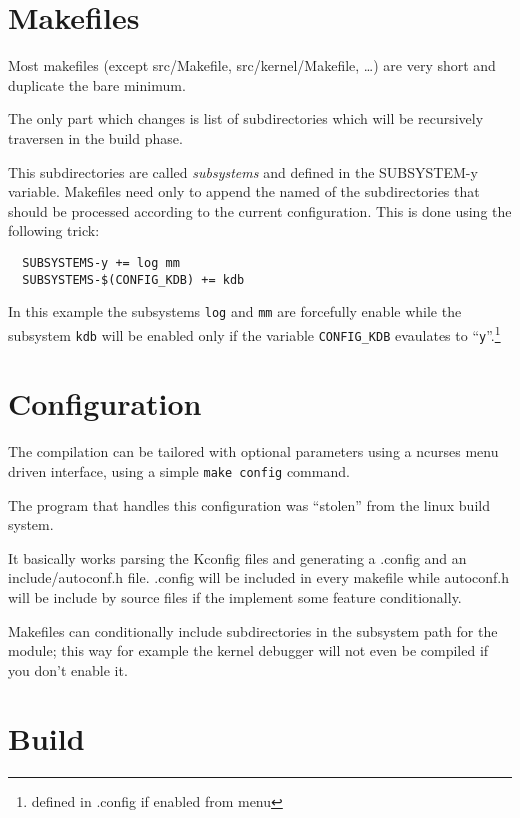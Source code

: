 \section{Makefiles}

Most makefiles (except src/Makefile, src/kernel/Makefile, \ldots) are very short and duplicate
the bare minimum.

The only part which changes is list of subdirectories which will be recursively traversen in the
build phase.

This subdirectories are called \emph{subsystems} and defined in the \textsf{SUBSYSTEM-y} variable.
Makefiles need only to append the named of the subdirectories that should be processed
according to the current configuration. This is done using the following trick:

\begin{verbatim}
  SUBSYSTEMS-y += log mm
  SUBSYSTEMS-$(CONFIG_KDB) += kdb  
\end{verbatim} %
 
\noindent In this example the subsystems \texttt{log} and \texttt{mm} are forcefully enable 
while the subsystem \texttt{kdb} will be enabled only if the variable \texttt{CONFIG\_KDB}
evaulates to ``\texttt{y}''.\footnote{defined in \textsf{.config} if enabled from menu}


\section{Configuration}

The \acaros compilation can be tailored with optional parameters using a ncurses menu driven interface, using a simple \texttt{make config} command.

The program that handles this configuration was ``stolen'' from the linux build system.

It basically works parsing the \textsf{Kconfig} files and generating a \textsf{.config} and 
an \textsf{include/autoconf.h} file. \textsf{.config} will be included in every makefile
while \textsf{autoconf.h} will be include by source files if the implement some feature 
conditionally.

Makefiles can conditionally include subdirectories in the subsystem path for the module;
this way for example the kernel debugger will not even be compiled if you don't enable it.

\section{Build}

